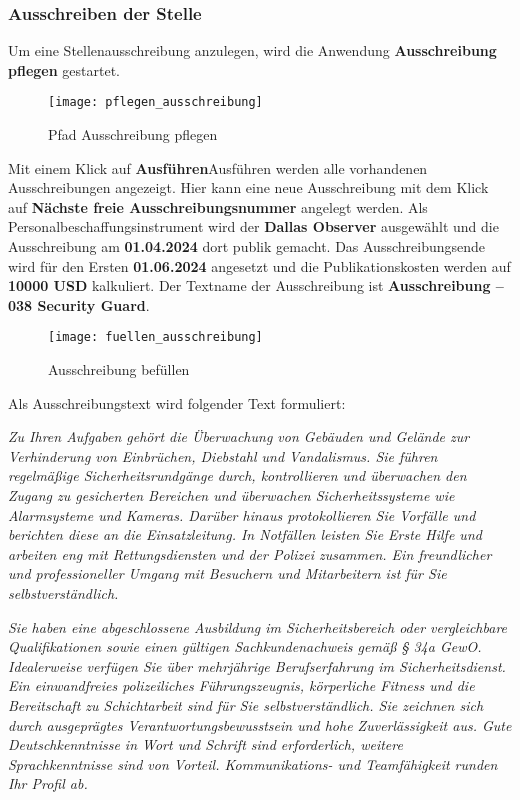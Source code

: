 \subsubsection{Ausschreiben der Stelle}
Um eine Stellenausschreibung anzulegen, wird die Anwendung \textbf{Ausschreibung pflegen} gestartet.
\begin{figure}[H]
	\centering
	\texttt{[image: pflegen\_ausschreibung]}
	\caption{Pfad Ausschreibung pflegen}
	\label{fig:pflegen_ausschreibung}
\end{figure}
Mit einem Klick auf \textbf{Ausführen}Ausführen werden alle vorhandenen Ausschreibungen angezeigt. Hier kann eine neue Ausschreibung mit dem Klick auf \textbf{Nächste freie Ausschreibungsnummer} angelegt werden. Als Personalbeschaffungsinstrument wird der \textbf{Dallas Observer} ausgewählt und die Ausschreibung am \textbf{01.04.2024} dort publik gemacht. Das Ausschreibungsende wird für den Ersten \textbf{01.06.2024} angesetzt und die Publikationskosten werden auf \textbf{10000 USD} kalkuliert. Der Textname der Ausschreibung ist \textbf{Ausschreibung – 038 Security Guard}.
\begin{figure}[H]
	\centering
	\texttt{[image: fuellen\_ausschreibung]}
	\caption{Ausschreibung befüllen}
	\label{fig:fuellen_ausschreibung}
\end{figure}
Als Ausschreibungstext wird folgender Text formuliert:

\textsl{
	Zu Ihren Aufgaben gehört die Überwachung von Gebäuden und Gelände zur Verhinderung von Einbrüchen, Diebstahl und Vandalismus. Sie führen regelmäßige Sicherheitsrundgänge durch, kontrollieren und überwachen den Zugang zu gesicherten Bereichen und überwachen Sicherheitssysteme wie Alarmsysteme und Kameras. Darüber hinaus protokollieren Sie Vorfälle und berichten diese an die Einsatzleitung. In Notfällen leisten Sie Erste Hilfe und arbeiten eng mit Rettungsdiensten und der Polizei zusammen. Ein freundlicher und professioneller Umgang mit Besuchern und Mitarbeitern ist für Sie selbstverständlich.
}

\textsl{
	Sie haben eine abgeschlossene Ausbildung im Sicherheitsbereich oder vergleichbare Qualifikationen sowie einen gültigen Sachkundenachweis gemäß § 34a GewO. Idealerweise verfügen Sie über mehrjährige Berufserfahrung im Sicherheitsdienst. Ein einwandfreies polizeiliches Führungszeugnis, körperliche Fitness und die Bereitschaft zu Schichtarbeit sind für Sie selbstverständlich. Sie zeichnen sich durch ausgeprägtes Verantwortungsbewusstsein und hohe Zuverlässigkeit aus. Gute Deutschkenntnisse in Wort und Schrift sind erforderlich, weitere Sprachkenntnisse sind von Vorteil. Kommunikations- und Teamfähigkeit runden Ihr Profil ab.
}

